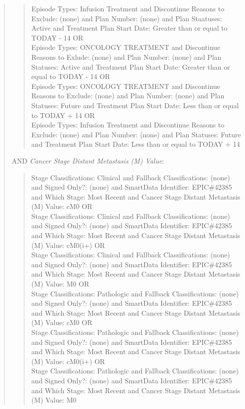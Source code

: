 \documentclass[
]{book}
\begin{document}
\begin{quote}
\begin{quote}
Episode Types: Infusion Treatment and Discontinue Reasons to Exclude: (none) and Plan Number: (none) and Plan Staatuses: Active and Treatment Plan Start Date: Greater than or equal to TODAY - 14 OR\\
Episode Types: ONCOLOGY TREATMENT and Discontinue Reasons to Exlude: (none) and Plan Number: (none) and Plan Statuses: Active and Treatment Plan Start Date: Greater than or equal to TODAY - 14 OR\\
Episode Types: ONCOLOGY TREATMENT and Discontinue Reasons to Exclude: (none) and Plan Number: (none) and Plan Statuses: Future and Treatment Plan Start Date: Less than or equal to TODAY + 14 OR\\
Episode Types: Infusion Treatment and Discontinue Reasons to Exclude: (none) and Plan Number: (none) and Plan Statuses: Future and Treatment Plan Start Date: Less than or equal to TODAY + 14\\
\end{quote}

AND \emph{Cancer Stage Distant Metastasis (M) Value}:\\

\begin{quote}
Stage Classifications: Clinical and Fallback Classifications: (none) and Signed Only?: (none) and SmartData Identifier: EPIC\#42385 and Which Stage: Most Recent and Cancer Stage Distant Metastasis (M) Value: cM0 OR\\
Stage Classifications: Clinical and Fallback Classifications: (none) and Signed Only?: (none) and SmartData Identifier: EPIC\#42385 and Which Stage: Most Recent and Cancer Stage Distant Metastasis (M) Value: cM0(i+) OR\\
Stage Classifications: Clinical and Fallback Classifications: (none) and Signed Only?: (none) and SmartData Identifier: EPIC\#42385 and Which Stage: Most Recent and Cancer Stage Distant Metastasis (M) Value: M0 OR\\
Stage Classifications: Pathologic and Fallback Classifications: (none) and Signed Only?: (none) and SmartData Identifier: EPIC\#42385 and Which Stage: Most Recent and Cancer Stage Distant Metastasis (M) Value: cM0 OR\\
Stage Classifications: Pathologic and Fallback Classifications: (none) and Signed Only?: (none) and SmartData Identifier: EPIC\#42385 and Which Stage: Most Recent and Cancer Stage Distant Metastasis (M) Value: cM0(i+) OR\\
Stage Classifications: Pathologic and Fallback Classifications: (none) and Signed Only?: (none) and SmartData Identifier: EPIC\#42385 and Which Stage: Most Recent and Cancer Stage Distant Metastasis (M) Value: M0\\
\end{quote}


\end{quote}
\end{document}

